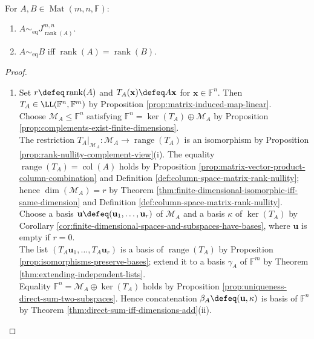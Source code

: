 \begin{theorem} \label{thm:rank-classifies-matrix-equivalence} \\
For $A,B\in\operatorname{Mat}(m,n,\mathbb{F})$:
\begin{enumerate}[label=(\roman*)]
\setlength{\itemsep}{0pt}
\item $A\sim_{\mathrm{eq}}J_{\operatorname{rank}(A)}^{m,n}$.
\item $A\sim_{\mathrm{eq}}B$ iff $\operatorname{rank}(A)=\operatorname{rank}(B)$.
\end{enumerate}
\begin{proof}
\begin{enumerate}[label=(\roman*)]
\setlength{\itemsep}{0pt}
\item[$(i)$] Set $r\defeq\operatorname{rank}(A)$ and $T_A(\mathbf{x})\defeq A\mathbf{x}$ for $\mathbf{x}\in\mathbb{F}^n$. Then $T_A\in\LL(\mathbb{F}^n,\mathbb{F}^m)$ by Proposition \ref{prop:matrix-induced-map-linear}.\\
Choose $\mathcal{M}_A\leq\mathbb{F}^n$ satisfying $\mathbb{F}^n=\ker(T_A)\oplus\mathcal{M}_A$ by Proposition \ref{prop:complements-exist-finite-dimensions}.\\
The restriction $T_A|_{\mathcal{M}_A}:\mathcal{M}_A\to\operatorname{range}(T_A)$ is an isomorphism by Proposition \ref{prop:rank-nullity-complement-view}(i). The equality $\operatorname{range}(T_A)=\operatorname{col}(A)$ holds by Proposition \ref{prop:matrix-vector-product-column-combination} and Definition \ref{def:column-space-matrix-rank-nullity}; hence $\dim(\mathcal{M}_A)=r$ by Theorem \ref{thm:finite-dimensional-isomorphic-iff-same-dimension} and Definition \ref{def:column-space-matrix-rank-nullity}.\\
Choose a basis $\mathbf{u}\defeq(\mathbf{u}_1,\ldots,\mathbf{u}_r)$ of $\mathcal{M}_A$ and a basis $\kappa$ of $\ker(T_A)$ by Corollary \ref{cor:finite-dimensional-spaces-and-subspaces-have-bases}, where $\mathbf{u}$ is empty if $r=0$.\\
The list $(T_A\mathbf{u}_1,\ldots,T_A\mathbf{u}_r)$ is a basis of $\operatorname{range}(T_A)$ by Proposition \ref{prop:isomorphisms-preserve-bases}; extend it to a basis $\gamma_A$ of $\mathbb{F}^m$ by Theorem \ref{thm:extending-independent-lists}.\\
Equality $\mathbb{F}^n=\mathcal{M}_A\oplus\ker(T_A)$ holds by Proposition \ref{prop:uniqueness-direct-sum-two-subspaces}. Hence concatenation $\beta_A\defeq(\mathbf{u},\kappa)$ is basis of $\mathbb{F}^n$ by Theorem \ref{thm:direct-sum-iff-dimensions-add}(ii).\\

\end{enumerate}
\end{proof}
\end{theorem}
